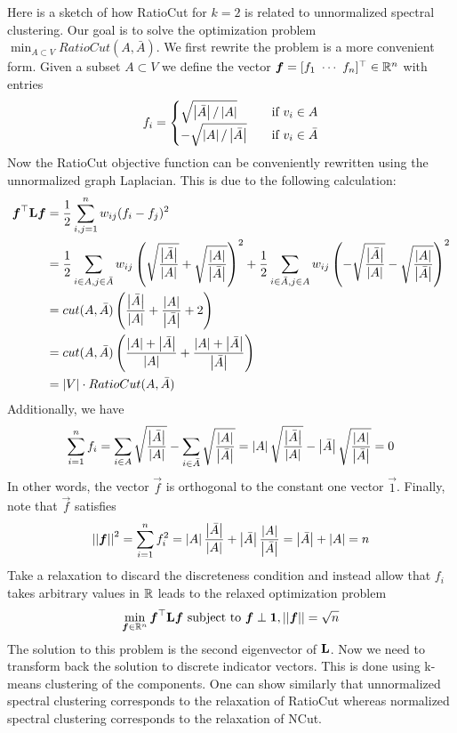 Here is a sketch of how RatioCut for $k=2$ is related to unnormalized spectral clustering. Our goal is to solve the optimization problem $\min_{A\subset V}RatioCut(A,\bar{A})$. We first rewrite the problem is a more convenient form. Given a subset $A\subset V$ we define the vector $\vec{f}=[f_1\ \cdots\ f_n]\T\in\bR^n$ with entries
\begin{align*}
f_i=\begin{cases}\sqrt{\left\vert\bar{A}\right\vert/\left\vert A\right\vert}&\quad\text{if }v_i\in A \\ -\sqrt{\left\vert A\right\vert/\left\vert\bar{A}\right\vert}&\quad\text{if }v_i\in\bar{A}\end{cases}
\end{align*}
Now the RatioCut objective function can be conveniently rewritten using the unnormalized graph Laplacian. This is due to the following calculation:
\begin{align*}
\boldsymbol{f}^\top\mathbf{L}\boldsymbol{f}&=\frac{1}{2}\sum_{i,j=1}^nw_{ij}(f_i-f_j)^2 \\
&=\frac{1}{2}\sum_{i\in A,j\in\bar{A}}w_{ij}\left(\sqrt{\frac{\left\vert\bar{A}\right\vert}{\left\vert A\right\vert}}+\sqrt{\frac{\left\vert A\right\vert}{\left\vert\bar{A}\right\vert}}\right)^2+\frac{1}{2}\sum_{i\in\bar{A},j\in A}w_{ij}\left(-\sqrt{\frac{\left\vert\bar{A}\right\vert}{\left\vert A\right\vert}}-\sqrt{\frac{\left\vert A\right\vert}{\left\vert\bar{A}\right\vert}}\right)^2 \\
&=cut(A,\bar{A})\left(\frac{\left\vert\bar{A}\right\vert}{\left\vert A\right\vert}+\frac{\left\vert A\right\vert}{\left\vert\bar{A}\right\vert}+2\right) \\
&=cut(A,\bar{A})\left(\frac{\left\vert A\right\vert+\left\vert\bar{A}\right\vert}{\left\vert A\right\vert}+\frac{\left\vert A\right\vert+\left\vert\bar{A}\right\vert}{\left\vert\bar{A}\right\vert}\right) \\
&=\left\vert V\right\vert\cdot RatioCut(A,\bar{A})
\end{align*}
Additionally, we have
\begin{align*}
\sum_{i=1}^nf_i=\sum_{i\in A}\sqrt{\frac{\left\vert\bar{A}\right\vert}{\left\vert A\right\vert}}-\sum_{i\in\bar{A}}\sqrt{\frac{\left\vert A\right\vert}{\left\vert\bar{A}\right\vert}}=\left\vert A\right\vert\sqrt{\frac{\left\vert\bar{A}\right\vert}{\left\vert A\right\vert}}-\left\vert\bar{A}\right\vert\sqrt{\frac{\left\vert A\right\vert}{\left\vert\bar{A}\right\vert}}=0
\end{align*}
In other words, the vector $\vec{f}$ is orthogonal to the constant one vector $\vec{1}$. Finally, note that $\vec{f}$ satisfies
\begin{align*}
\left\vert\left\vert \boldsymbol{f} \right\vert\right\vert^2=\sum_{i=1}^nf_i^2=\left\vert A\right\vert\frac{\left\vert\bar{A}\right\vert}{\left\vert A\right\vert}+\left\vert\bar{A}\right\vert\frac{\left\vert A\right\vert}{\left\vert\bar{A}\right\vert}=\left\vert\bar{A}\right\vert+\left\vert A\right\vert=n
\end{align*}
Take a relaxation to discard the discreteness condition and instead allow that $f_i$ takes arbitrary values in $\mathbb{R}$ leads to the relaxed optimization problem
\begin{align*}
\min_{\boldsymbol{f}\in\mathbb{R}^n}\boldsymbol{f}^\top\mathbf{L}\boldsymbol{f}\ \text{subject to }\boldsymbol{f}\perp\boldsymbol{1},\left\vert\left\vert \boldsymbol{f} \right\vert\right\vert=\sqrt{n}
\end{align*}
The solution to this problem is the second eigenvector of $\mathbf{L}$. Now we need to transform back the solution to discrete indicator vectors. This is done using k-means clustering of the components. One can show similarly that unnormalized spectral clustering corresponds to the relaxation of RatioCut whereas normalized spectral clustering corresponds to the relaxation of NCut.

